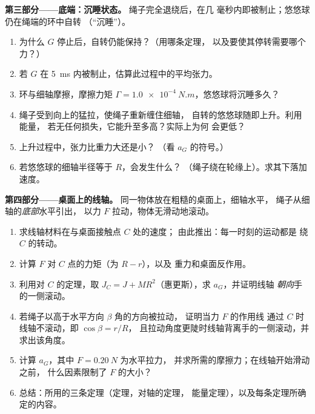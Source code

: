 \begin{problem}
\medskip
\noindent\textbf{第三部分——底端：沉睡状态。}
绳子完全退绕后，在几
毫秒内即被制止；悠悠球仍在绳端的环中自转
（“沉睡”）。
\begin{enumerate}[resume]
  \item 为什么 $G$ 停止后，自转仍能保持？（用哪条定理，
        以及要使其停转需要哪个力？）
  \item 若 $G$ 在
        \qty{5}{ms} 内被制止，估算此过程中的平均张力。
  \item 环与细轴摩擦，摩擦力矩 $\Gamma =
        \qty{1.0e-4}{N.m}$，悠悠球将沉睡多久？
  \item 绳子受到向上的猛拉，使绳子重新缠住细轴，
        自转的悠悠球随即上升。利用能量，
        若无任何损失，它能升至多高？实际上为何
        会更低？
  \item 上升过程中，张力比重力大还是小？
        （看 $a_G$ 的符号。）
  \item 若悠悠球的细轴半径等于 $R$，会发生什么？
        （绳子绕在轮缘上）。求其下落加速度。
\end{enumerate}

\medskip
\noindent\textbf{第四部分——桌面上的线轴。}
同一物体放在粗糙的桌面上，细轴水平，
绳子从细轴的\emph{底部}水平引出，
以力 $F$ 拉动，物体无滑动地滚动。
\begin{enumerate}[resume]
  \item 求线轴材料在与桌面接触点 $C$ 处的速度；
        由此推出：每一时刻的运动都是
        绕 $C$ 的转动。
  \item 计算 $F$ 对 $C$ 点的力矩（为 $R - r$），以及
        重力和桌面反作用。
  \item 利用对 $C$ 的定理，取 $J_C = J +
        MR^2$（惠更斯），求 $a_G$，并证明线轴
        \emph{朝向}手的一侧滚动。
  \item 若绳子以高于水平方向 $\beta$ 角的方向被拉动，
        证明当力 $F$ 的作用线
        通过 $C$ 时线轴不滚动，即 $\cos\beta = r/R$，
        且拉动角度更陡时线轴背离手的一侧滚动，并求出该角度。
  \item 计算 $a_G$，其中 $F = \qty{0.20}{N}$ 为水平拉力，
        并求所需的摩擦力；在线轴开始滑动之前，
        什么因素限制了 $F$ 的大小？
  \item 总结：所用的三条定理（定理，对轴的定理，
        能量定理），以及每条定理所确定的内容。
\end{enumerate}
\end{problem}
